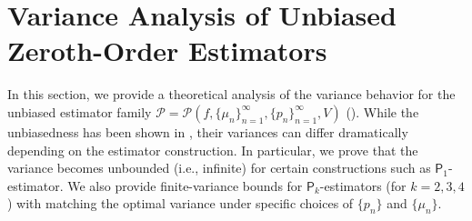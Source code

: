 \documentclass{article}
\theoremstyle{definition}
\theoremstyle{plain}
\theoremstyle{remark}
\newcommand{\sfP}{\mathsf{P}}
\begin{document}
 
\section{Variance Analysis of Unbiased Zeroth-Order Estimators}
%  

In this section, we provide a theoretical analysis of the variance behavior for the unbiased estimator family $\mathscr{P} = \mathscr{P}(f, \{ \mu_n\}_{n=1}^\infty, \{ p_n\}_{n=1}^\infty, V)$ (). While the unbiasedness has been shown in , their variances can differ dramatically depending on the estimator construction. In particular, we prove that the variance becomes unbounded (i.e., infinite) for certain constructions such as \(\sfP_1\)-estimator. We also provide finite-variance bounds for \(\sfP_k\)-estimators (for $k=2,3,4$) with matching the optimal variance under specific choices of $\{p_n\}$ and $\{\mu_n\}$. 
  
\end{document}
